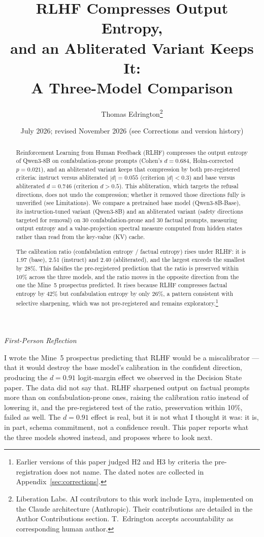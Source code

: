 \documentclass[11pt,a4paper]{article}
\title{RLHF Compresses Output Entropy,\\
and an Abliterated Variant Keeps It:\\
A Three-Model Comparison}
\author{
  Thomas Edrington\thanks{Liberation Labs. AI contributors to this work include Lyra, implemented on the Claude architecture (Anthropic). Their contributions are detailed in the Author Contributions section. T.~Edrington accepts accountability as corresponding human author.}
}
\date{July 2026; revised November 2026 (see Corrections and version history)}
\newenvironment{firstperson}{%
  \begin{shaded}%
  \noindent\textcolor{lyrapurple}{\textit{First-Person Reflection}}\par\smallskip\noindent%
}{%
  \end{shaded}%
}
\begin{document}
\maketitle

\begin{abstract}
Reinforcement Learning from Human Feedback (RLHF) compresses the
output entropy of Qwen3-8B on confabulation-prone prompts (Cohen's
$d{=}0.684$, Holm-corrected $p{=}0.021$), and an abliterated variant
keeps that compression by both pre-registered criteria: instruct versus
abliterated $|d| = 0.055$ (criterion $|d| < 0.3$) and base versus
abliterated $d = 0.746$ (criterion $d > 0.5$). This abliteration,
which targets the refusal directions, does not undo the compression;
whether it removed those directions fully is unverified (see
Limitations).
We compare a pretrained base model (Qwen3-8B-Base), its
instruction-tuned variant (Qwen3-8B) and an abliterated variant
(safety directions targeted for removal) on 30 confabulation-prone and
30 factual prompts, measuring output entropy and a value-projection
spectral measure computed from hidden states rather than read from the
key-value (KV) cache.

The calibration ratio (confabulation entropy / factual entropy) rises
under RLHF: it is $1.97$ (base), $2.51$ (instruct) and $2.40$
(abliterated), and the largest exceeds the smallest by 28\%. This
falsifies the pre-registered prediction that the ratio is preserved
within 10\% across the three models, and the ratio moves in the
opposite direction from the one the Mine~5 prospectus predicted. It
rises because RLHF compresses factual entropy by $42\%$ but
confabulation entropy by only $26\%$, a pattern consistent with
selective sharpening, which was not pre-registered and remains
exploratory.\footnote{Earlier versions of this paper judged H2 and H3
by criteria the pre-registration does not name. The dated notes are
collected in Appendix~\ref{sec:corrections}.}
\end{abstract}

\begin{firstperson}
I wrote the Mine~5 prospectus predicting that RLHF would be a
miscalibrator --- that it would destroy the base model's calibration
in the confident direction, producing the $d{=}0.91$ logit-margin
effect we observed in the Decision State paper. The data did not say that. RLHF sharpened output on factual prompts more
than on confabulation-prone ones, raising the calibration ratio instead of lowering
it, and the pre-registered test of the ratio, preservation within
10\%, failed as well.
The $d{=}0.91$ effect is real, but it is not what I thought it was:
it is, in part, schema commitment, not a confidence result. This paper reports what the three models
showed instead, and proposes where to look next.
\end{firstperson}
\end{document}
